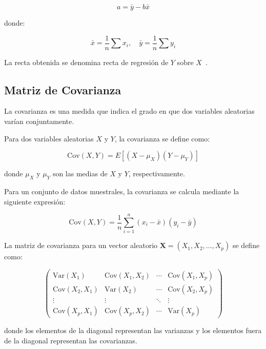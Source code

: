 \documentclass[twocolumn]{article} %
\begin{document}
\begin{equation}
    a = \bar{y} - b \bar{x}
\end{equation}

donde:

\begin{equation}
    \bar{x} = \frac{1}{n}\sum x_i, \quad \bar{y} = \frac{1}{n}\sum y_i
\end{equation}

La recta obtenida se denomina recta de regresión de $Y$ sobre $X$~\cite{marques1991probabilidad}.


\subsection{Matriz de Covarianza}\label{covarianza}
La covarianza es una medida que indica el grado en que dos variables aleatorias varían conjuntamente.

Para dos variables aleatorias $X$ y $Y$, la covarianza se define como:

\begin{equation}
\mathrm{Cov}(X,Y) = E[(X - \mu_X)(Y - \mu_Y)]
\end{equation}

donde $\mu_X$ y $\mu_Y$ son las medias de $X$ y $Y$, respectivamente.

Para un conjunto de datos muestrales, la covarianza se calcula mediante la siguiente expresión:

\begin{equation}
\mathrm{Cov}(X,Y) = \frac{1}{n} \sum_{i=1}^{n} (x_i - \bar{x})(y_i - \bar{y})
\end{equation}

La matriz de covarianza para un vector aleatorio $\mathbf{X} = (X_1, X_2, \dots, X_p)$ se define como:

\begin{equation}
\begin{pmatrix}
\mathrm{Var}(X_1) & \mathrm{Cov}(X_1,X_2) & \cdots & \mathrm{Cov}(X_1,X_p) \\
\mathrm{Cov}(X_2,X_1) & \mathrm{Var}(X_2) & \cdots & \mathrm{Cov}(X_2,X_p) \\
\vdots & \vdots & \ddots & \vdots \\
\mathrm{Cov}(X_p,X_1) & \mathrm{Cov}(X_p,X_2) & \cdots & \mathrm{Var}(X_p)
\end{pmatrix}
\end{equation}

donde los elementos de la diagonal representan las varianzas y los elementos fuera de la diagonal representan las covarianzas.
\end{document}
